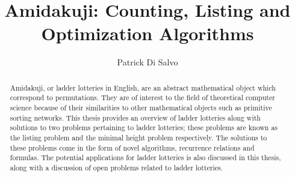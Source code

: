 \documentclass[11pt,draft,dvipsnames]{gthesis}
\begin{document}
\title{Amidakuji: Counting, Listing and Optimization Algorithms}

\author{Patrick Di Salvo}







\maketitle


\begin{abstract}

Amidakuji, or ladder lotteries in English, are an abstract mathematical object which correspond to permutations. 
They are of interest to the field of theoretical computer science because of their similarities to other 
mathematical objects such as primitive sorting networks.
This thesis provides an overview of ladder lotteries along with solutions to two problems pertaining to ladder lotteries;
these problems are known as the listing problem and the minimal height problem respectively. 
The solutions to these problems come in the form of novel algorithms, recurrence relations and formulas. 
The potential applications for ladder lotteries is also discussed in this thesis, 
along with a discussion of open problems related to ladder lotteries.

\medskip

\small
\centering

\end{abstract}

\begin{frontmatter}





\tableofcontents
\listoftables
\listoffigures

\end{frontmatter}

\dsp


\ssp
  
  
\dsp


\appendix

\end{document}
